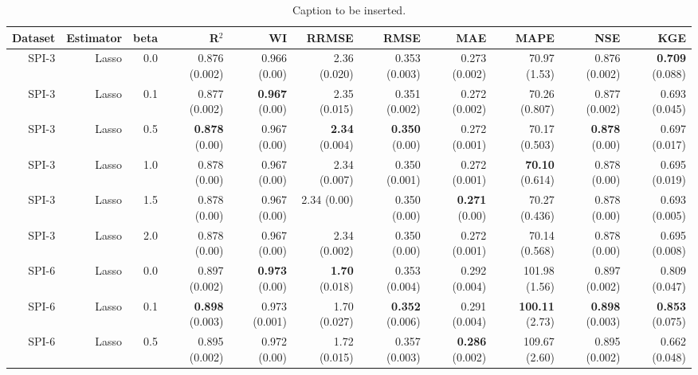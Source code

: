 \begin{table}
\centering
\caption{Caption to be inserted.}
\label{sp__comparison_datasets_table}
\begin{tabular}{rrrrrrrrrrr}
\toprule
Dataset & Estimator &  beta &                R$^2$ &                  WI &               RRMSE &                 RMSE &                  MAE &                  MAPE &                  NSE &                  KGE \\
\midrule
  SPI-3 &     Lasso &   0.0 &        0.876 (0.002) &        0.966 (0.00) &        2.36 (0.020) &        0.353 (0.003) &        0.273 (0.002) &          70.97 (1.53) &        0.876 (0.002) & { \bf 0.709} (0.088) \\
  SPI-3 &     Lasso &   0.1 &        0.877 (0.002) & { \bf 0.967} (0.00) &        2.35 (0.015) &        0.351 (0.002) &        0.272 (0.002) &         70.26 (0.807) &        0.877 (0.002) &        0.693 (0.045) \\
  SPI-3 &     Lasso &   0.5 &  { \bf 0.878} (0.00) &        0.967 (0.00) & { \bf 2.34} (0.004) &  { \bf 0.350} (0.00) &        0.272 (0.001) &         70.17 (0.503) &  { \bf 0.878} (0.00) &        0.697 (0.017) \\
  SPI-3 &     Lasso &   1.0 &         0.878 (0.00) &        0.967 (0.00) &        2.34 (0.007) &        0.350 (0.001) &        0.272 (0.001) &  { \bf 70.10} (0.614) &         0.878 (0.00) &        0.695 (0.019) \\
  SPI-3 &     Lasso &   1.5 &         0.878 (0.00) &        0.967 (0.00) &         2.34 (0.00) &         0.350 (0.00) &  { \bf 0.271} (0.00) &         70.27 (0.436) &         0.878 (0.00) &        0.693 (0.005) \\
  SPI-3 &     Lasso &   2.0 &         0.878 (0.00) &        0.967 (0.00) &        2.34 (0.002) &         0.350 (0.00) &        0.272 (0.001) &         70.14 (0.568) &         0.878 (0.00) &        0.695 (0.008) \\
  SPI-6 &     Lasso &   0.0 &        0.897 (0.002) & { \bf 0.973} (0.00) & { \bf 1.70} (0.018) &        0.353 (0.004) &        0.292 (0.004) &         101.98 (1.56) &        0.897 (0.002) &        0.809 (0.047) \\
  SPI-6 &     Lasso &   0.1 & { \bf 0.898} (0.003) &       0.973 (0.001) &        1.70 (0.027) & { \bf 0.352} (0.006) &        0.291 (0.004) &  { \bf 100.11} (2.73) & { \bf 0.898} (0.003) & { \bf 0.853} (0.075) \\
  SPI-6 &     Lasso &   0.5 &        0.895 (0.002) &        0.972 (0.00) &        1.72 (0.015) &        0.357 (0.003) & { \bf 0.286} (0.002) &         109.67 (2.60) &        0.895 (0.002) &        0.662 (0.048) \\

\end{tabular}
\end{table}
